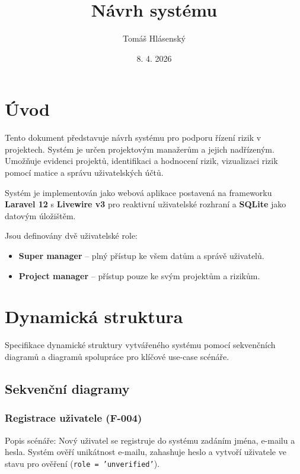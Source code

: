 \documentclass{mpr}
\title{Návrh systému}
\author{Tomáš Hlásenský}
\date{8. 4. 2026}
\begin{document}
\maketitle
\tableofcontents

\section{Úvod}

Tento dokument představuje návrh systému pro podporu řízení rizik v projektech.
Systém je určen projektovým manažerům a jejich nadřízeným.
Umožňuje evidenci projektů, identifikaci a hodnocení rizik, vizualizaci rizik
pomocí matice a správu uživatelských účtů.

Systém je implementován jako webová aplikace postavená na frameworku
\textbf{Laravel 12} s \textbf{Livewire v3} pro reaktivní uživatelské rozhraní
a \textbf{SQLite} jako datovým úložištěm.

Jsou definovány dvě uživatelské role:

\begin{itemize}
    \item \textbf{Super manager} – plný přístup ke všem datům a správě uživatelů.
    \item \textbf{Project manager} – přístup pouze ke svým projektům a rizikům.
\end{itemize}

\section{Dynamická struktura}

Specifikace dynamické struktury vytvářeného systému pomocí sekvenčních diagramů
a diagramů spolupráce pro klíčové use-case scénáře.

\subsection{Sekvenční diagramy}

\subsubsection{Registrace uživatele (F-004)}

Popis scénáře: Nový uživatel se registruje do systému zadáním jména, e-mailu
a hesla. Systém ověří unikátnost e-mailu, zahashuje heslo a vytvoří uživatele
ve stavu pro ověření (\texttt{role = 'unverified'}).
\end{document}
